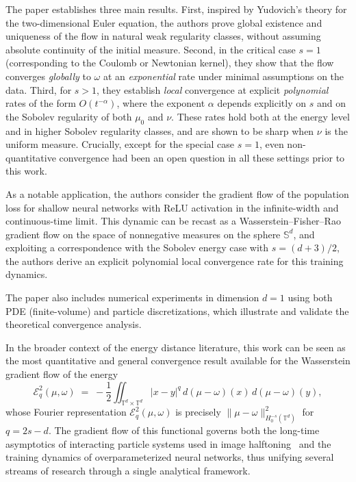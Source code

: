 \documentclass[12pt,a4paper,oneside]{amsart}
\theoremstyle{plain}
\theoremstyle{definition}
\numberwithin{equation}{section}
\numberwithin{figure}{section}
\numberwithin{table}{section}
\theoremstyle{remark}
\begin{document}
The paper establishes three main results.
First, inspired by Yudovich's theory for the two-dimensional Euler equation,
the authors prove global existence and uniqueness of the flow in natural weak
regularity classes, without assuming absolute continuity of the initial measure.
Second, in the critical case $s = 1$ (corresponding to the Coulomb or Newtonian
kernel), they show that the flow converges \emph{globally} to $\omega$ at an
\emph{exponential} rate under minimal assumptions on the data.
Third, for $s > 1$, they establish \emph{local} convergence at explicit
\emph{polynomial} rates of the form $O(t^{-\alpha})$, where the exponent $\alpha$
depends explicitly on $s$ and on the Sobolev regularity of both $\mu_0$ and $\nu$.
These rates hold both at the energy level and in higher Sobolev regularity classes,
and are shown to be sharp when $\nu$ is the uniform measure.
Crucially, except for the special case $s = 1$, even non-quantitative convergence
had been an open question in all these settings prior to this work.
 
As a notable application, the authors consider the gradient flow of the population
loss for shallow neural networks with ReLU activation in the infinite-width and
continuous-time limit. This dynamic can be recast as a Wasserstein--Fisher--Rao
gradient flow on the space of nonneg\-ative measures on the sphere $\mathbb{S}^d$,
and exploiting a correspondence with the Sobolev energy case with $s = (d+3)/2$,
the authors derive an explicit polynomial local convergence rate for this training
dynamics.
 
The paper also includes numerical experiments in dimension $d = 1$ using both PDE
(finite-volume) and particle discretizations, which illustrate and validate the
theoretical convergence analysis.
 
In the broader context of the energy distance literature, this work can be seen as
the most quantitative and general convergence result available for the Wasserstein
gradient flow of the energy
\[
  \mathcal{E}_q^2(\mu, \omega)
  \;=\;
  -\frac{1}{2}
  \iint_{\mathbb T^d \times \mathbb T^d}
  |x - y|^q \, d(\mu - \omega)(x)\, d(\mu - \omega)(y),
\]
whose Fourier representation $\mathcal{E}_q^2(\mu,\omega)$ is precisely
$\|\mu - \omega\|_{H_0^{-s}(\mathbb T^d)}^2$ for $q = 2s - d$. The gradient flow of this
functional governs both the long-time asymptotics of interacting particle systems
used in image halftoning~\cite{schmaltz2010electrostatic,teuber2011dithering} and
the training dynamics of overparameterized neural networks, thus unifying several
streams of research through a single analytical framework.\\
\end{document}
